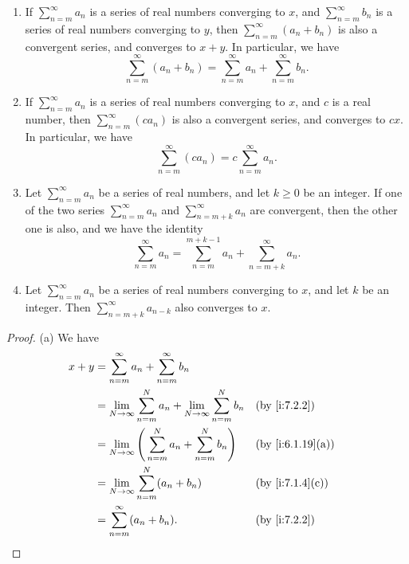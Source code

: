 \setcounter{thm}{13}
\begin{prop}\label{i:7.2.14}
  \begin{enumerate}
    \item If \(\sum_{n = m}^\infty a_n\) is a series of real numbers converging to \(x\), and \(\sum_{n = m}^\infty b_n\) is a series of real numbers converging to \(y\), then \(\sum_{n = m}^\infty (a_n + b_n)\) is also a convergent series, and converges to \(x + y\).
          In particular, we have
          \[
            \sum_{n = m}^\infty (a_n + b_n) = \sum_{n = m}^\infty a_n + \sum_{n = m}^\infty b_n.
          \]
    \item If \(\sum_{n = m}^\infty a_n\) is a series of real numbers converging to \(x\), and \(c\) is a real number, then \(\sum_{n = m}^\infty (c a_n)\) is also a convergent series, and converges to \(cx\).
          In particular, we have
          \[
            \sum_{n = m}^\infty (c a_n) = c \sum_{n = m}^\infty a_n.
          \]
    \item Let \(\sum_{n = m}^\infty a_n\) be a series of real numbers, and let \(k \geq 0\) be an integer.
          If one of the two series \(\sum_{n = m}^\infty a_n\) and \(\sum_{n = m + k}^\infty a_n\) are convergent, then the other one is also, and we have the identity
          \[
            \sum_{n = m}^\infty a_n = \sum_{n = m}^{m + k - 1} a_n + \sum_{n = m + k}^\infty a_n.
          \]
    \item Let \(\sum_{n = m}^\infty a_n\) be a series of real numbers converging to \(x\), and let \(k\) be an integer.
          Then \(\sum_{n = m + k}^\infty a_{n - k}\) also converges to \(x\).
  \end{enumerate}
\end{prop}

\begin{proof}{(a)}
  We have
  \begin{align*}
    x + y & = \sum_{n = m}^\infty a_n + \sum_{n = m}^\infty b_n                                                     \\
          & = \lim_{N \to \infty} \sum_{n = m}^N a_n + \lim_{N \to \infty} \sum_{n = m}^N b_n &  & \by{i:7.2.2}     \\
          & = \lim_{N \to \infty} \Bigg(\sum_{n = m}^N a_n + \sum_{n = m}^N b_n\Bigg)         &  & \by{i:6.1.19}[a] \\
          & = \lim_{N \to \infty} \sum_{n = m}^N (a_n + b_n)                                  &  & \by{i:7.1.4}[c]  \\
          & = \sum_{n = m}^\infty (a_n + b_n).                                                &  & \by{i:7.2.2}
  \end{align*}
\end{proof}

